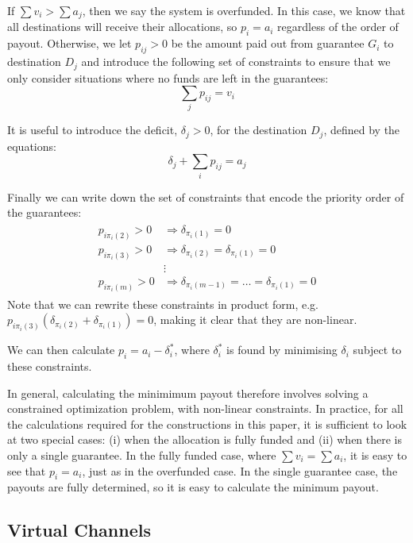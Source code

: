 If $\sum v_i > \sum a_j$, then we say the system is overfunded. 
In this case, we know that all destinations will receive their allocations, so $p_i = a_i$ regardless of the order of payout.
Otherwise, we let $p_{ij} > 0$ be the amount paid out from guarantee $G_i$ to destination $D_j$ and introduce the following set of constraints to ensure that we only consider situations where no funds are left in the guarantees:
\begin{equation}
  \sum_{j} p_{ij} = v_i
\end{equation}

It is useful to introduce the deficit, $\delta_j > 0$, for the destination $D_j$, defined by the equations:
\begin{equation}
  \delta_j + \sum_{i} p_{ij} = a_j
\end{equation}

Finally we can write down the set of constraints that encode the priority order of the guarantees:
\begin{align}
\begin{split}
  p_{i\pi_i(2)} > 0 &\Rightarrow \delta_{\pi_i(1)} = 0 \\
  p_{i\pi_i(3)} > 0 &\Rightarrow \delta_{\pi_i(2)} = \delta_{\pi_i(1)}  = 0 \\
  &\vdots \\
  p_{i\pi_i(m)} > 0 &\Rightarrow \delta_{\pi_i(m-1)} = \dots = \delta_{\pi_i(1)}  = 0 
\end{split}
\end{align}
Note that we can rewrite these constraints in product form, e.g. $p_{i\pi_i(3)}(\delta_{\pi_i(2)} + \delta_{\pi_i(1)}) = 0$, making it clear that they are non-linear.

We can then calculate $p_i = a_i - \delta_i^*$, where $\delta^*_i$ is found by minimising $\delta_i$ subject to these constraints.

In general, calculating the minimimum payout therefore involves solving a constrained optimization problem, with non-linear constraints.
In practice, for all the calculations required for the constructions in this paper, it is sufficient to look at two special cases: (i) when the allocation is fully funded and (ii) when there is only a single guarantee.
In the fully funded case, where $\sum v_i = \sum a_i$, it is easy to see that $p_i = a_i$, just as in the overfunded case.
In the single guarantee case, the payouts are fully determined, so it is easy to calculate the minimum payout.

\subsection{Virtual Channels}

